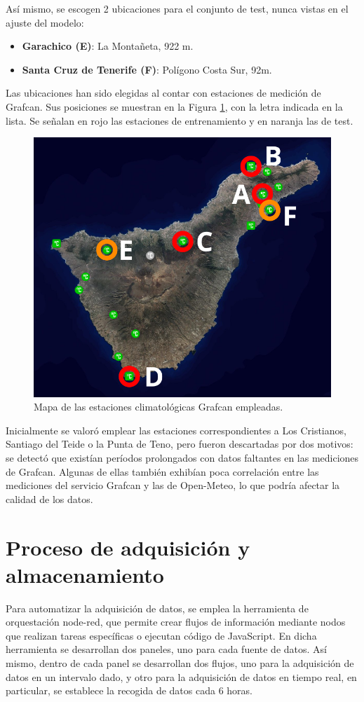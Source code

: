 Así mismo, se escogen 2 ubicaciones para el conjunto de test, nunca vistas en el ajuste del modelo:
\begin{itemize}
    \item \textbf{Garachico (E)}: La Montañeta, 922 m.
    \item \textbf{Santa Cruz de Tenerife (F)}: Polígono Costa Sur, 92m.
\end{itemize}

Las ubicaciones han sido elegidas al contar con estaciones de medición de Grafcan.
Sus posiciones se muestran en la Figura \ref{mapa_estaciones}, con la letra indicada en la lista.
Se señalan en rojo las estaciones de entrenamiento y en naranja las de test.

\begin{figure}[htb]
   \centering
   \includegraphics[width=0.6\linewidth]{images/mapa_estaciones}
   \caption{Mapa de las estaciones climatológicas Grafcan empleadas.}
   \label{mapa_estaciones}
\end{figure}

Inicialmente se valoró emplear las estaciones correspondientes a Los Cristianos, Santiago del Teide o la Punta de Teno, pero fueron descartadas por dos motivos: 
se detectó que existían períodos prolongados con datos faltantes en las mediciones de Grafcan. Algunas de ellas también exhibían poca correlación entre las mediciones
del servicio Grafcan y las de Open-Meteo, lo que podría afectar la calidad de los datos.

\bigskip

\section{Proceso de adquisición y almacenamiento}

Para automatizar la adquisición de datos, se emplea la herramienta de orquestación node-red, que permite crear flujos de información mediante nodos que realizan tareas específicas o ejecutan código de JavaScript.
En dicha herramienta se desarrollan dos paneles, uno para cada fuente de datos. 
Así mismo, dentro de cada panel se desarrollan dos flujos, uno para la adquisición de datos en un intervalo dado, y otro para la adquisición de datos en tiempo real, en particular, 
se establece la recogida de datos cada 6 horas.

